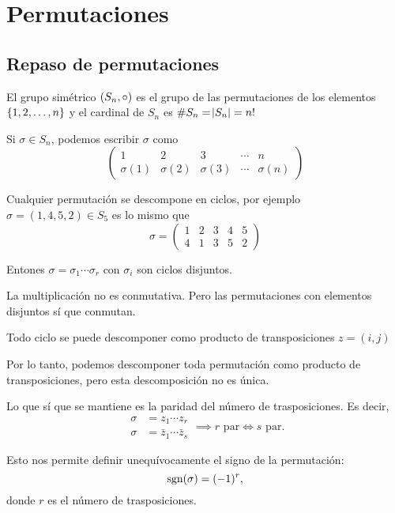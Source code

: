 \chapter{Permutaciones}

\section{Repaso de permutaciones}

El grupo simétrico $\left( S_n, \circ \right)$ es el grupo de las permutaciones de los elementos
$\left\{1, 2, \dots, n\right\}$ y el cardinal de $S_n$ es $\# S_n = \abs{S_n} = n!$

Si $\sigma \in S_n$, podemos escribir $\sigma$ como
\[
    \begin{pmatrix}
        1 & 2 & 3 & \cdots & n \\
        \sigma(1) & \sigma(2) & \sigma(3) & \cdots & \sigma(n)
    \end{pmatrix}
\]

Cualquier permutación se descompone en ciclos, por ejemplo
$\sigma = (1, 4, 5, 2) \in S_5$ es lo mismo que
\[
    \sigma = 
    \begin{pmatrix}
        1 & 2 & 3 & 4 & 5 \\
        4 & 1 & 3 & 5 & 2
    \end{pmatrix}
\]

Entones $\sigma = \sigma_1 \cdots \sigma_r$ con $\sigma_i$ son ciclos disjuntos.

\begin{obs}
    La multiplicación no es conmutativa. Pero las permutaciones con elementos disjuntos sí que conmutan.
\end{obs}

Todo ciclo se puede descomponer como producto de transposiciones $z = (i, j)$

Por lo tanto, podemos descomponer toda permutación como producto de transposiciones, pero esta
descomposición no es única.

Lo que sí que se mantiene es la paridad del número de trasposiciones. Es decir,
\[
    \begin{aligned}
        \sigma &= z_1 \cdots z_r \\
        \sigma &= \bar{z}_1 \cdots \bar{z}_s
    \end{aligned} \implies r \text{ par} \iff s \text{ par}.
\]

Esto nos permite definir unequívocamente el signo de la permutación:
\[
    \text{sgn}(\sigma) = (-1)^{r},
\]
donde $r$ es el número de trasposiciones.

